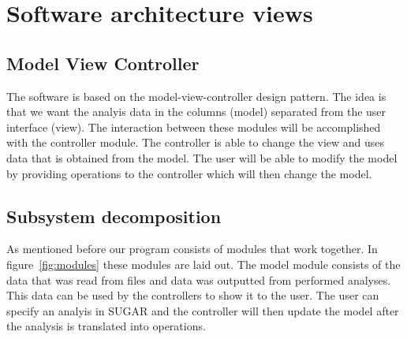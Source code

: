 \documentclass[a4paper]{article}
\begin{document}
\section{Software architecture views}

\subsection{Model View Controller}
\label{subsec:mvc}
The software is based on the model-view-controller design pattern. The idea is that we want the analyis data in the columns (model) separated from the user interface (view). The interaction between these modules will be accomplished with the controller module. The controller is able to change the view and uses data that is obtained from the model. The user will be able to modify the model by providing operations to the controller which will then change the model.

\subsection{Subsystem decomposition}

As mentioned before our program consists of modules that work together. In figure~\ref{fig:modules} these modules are laid out. The model module consists of the data that was read from files and data was outputted from performed analyses. This data can be used by the controllers to show it to the user. The user can specify an analyis in SUGAR and the controller will then update the model after the analysis is translated into operations.
\end{document}
